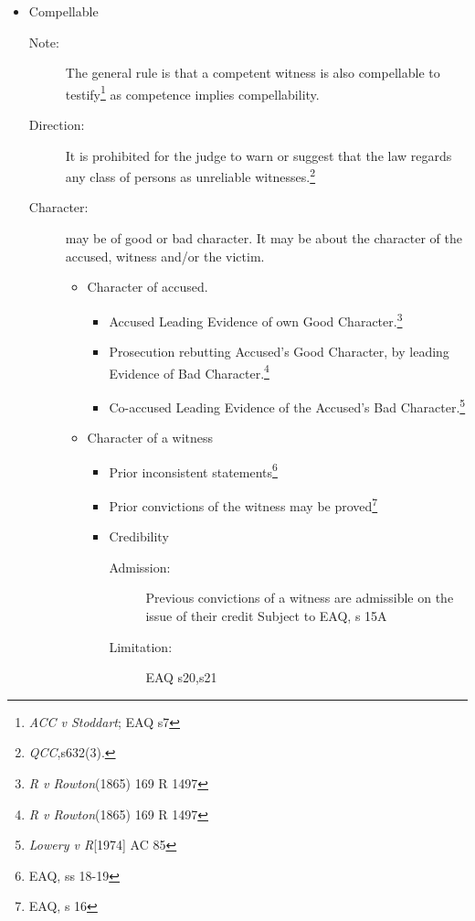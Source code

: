 \begin{itemize}
    \item Compellable
        \begin{description}
            \item[Note:]The general rule is that a competent witness is also compellable to testify\footnote{\textit{ACC v Stoddart}; EAQ s7} as competence implies compellability.
            \item[Direction:]It is prohibited for the judge to warn or suggest that the law regards any class of persons as unreliable witnesses.\footnote{\textit{QCC},s632(3).}
            \item[Character:] may be of good or bad character. It may be about the character of the accused, witness and/or the victim.
                \begin{itemize}
                    \item Character of accused.
                        \begin{itemize}
                            \item Accused Leading Evidence of own Good Character.\footnote{\textit{R v Rowton}(1865) 169 R 1497}
                            \item Prosecution rebutting Accused’s Good Character, by leading Evidence of Bad Character.\footnote{\textit{R v Rowton}(1865) 169 R 1497}
                            \item Co-accused Leading Evidence of the Accused’s Bad Character.\footnote{\textit{Lowery v R}[1974] AC 85}
                        \end{itemize}
                    \item Character of a witness
                        \begin{itemize}
                            \item Prior inconsistent statements\footnote{EAQ, ss 18-19}
                            \item Prior convictions of the witness may be proved\footnote{EAQ, s 16}
                            \item Credibility
                                \begin{description}
                                    \item[Admission:] Previous convictions of a witness are admissible on the issue of their credit Subject to EAQ, s 15A
                                    \item[Limitation:] EAQ s20,s21 
                                \end{description}
                        \end{itemize}
                \end{itemize}
        \end{description}


\end{itemize}
